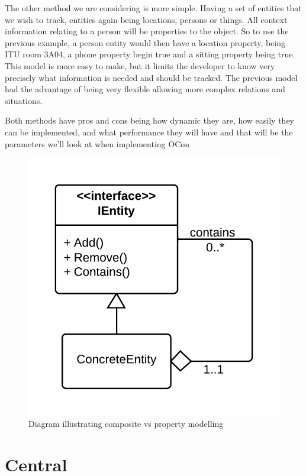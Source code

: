 \documentclass[../report.tex]{subfiles}
\begin{document}
The other method we are considering is more simple. Having a set of entities that we wish to track, entities again being locations, persons or things. All context information relating to a person will be properties to the object. So to use the previous example, a person entity would then have a location property, being ITU room 3A04, a phone property begin true and a sitting property being true. This model is more easy to make, but it limits the developer to know very precisely what information is needed and should be tracked. The previous model had the advantage of being very flexible allowing more complex relations and situations. 

Both methods have pros and cons being how dynamic they are, how easily they can be implemented, and what performance they will have and that will be the parameters we'll look at when implementing OCon 

\begin{figure}[h]
\centering
\includegraphics[width=\linewidth]{composite.png}
\caption{Diagram illustrating composite vs property modelling}
\label{fig:composite}
\end{figure}


\section{Central}
\end{document}
